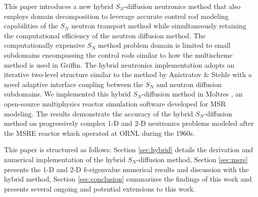 This paper introduces a new hybrid $S_N$-diffusion neutronics method that also employs domain
decomposition to leverage accurate control rod modeling capabilities of the $S_N$ neutron transport
method while simultaneously retaining the computational efficiency of the neutron diffusion method.
The computationally expensive $S_N$ method problem domain is limited to small subdomains
encompassing the control rods similar to how the multischeme method is used in Griffin. The
hybrid neutronics implementation adopts an iterative two-level structure similar to the method by
Anistratov \& Stehle with a novel adaptive interface coupling between the $S_N$ and neutron
diffusion subdomains. We implemented this hybrid $S_N$-diffusion method in Moltres
\cite{lindsay_moltres_2017, park_verification_2022}, an open-source multiphysics reactor simulation
software developed for \gls{MSR} modeling. The results demonstrate the accuracy of the hybrid
$S_N$-diffusion method on progressively complex 1-D and 2-D neutronics problems modeled after
the \gls{MSRE} reactor which operated at \gls{ORNL} during the 1960s.

This paper is structured as follows: Section \ref{sec:hybrid} details the derivation and
numerical implementation of the hybrid $S_N$-diffusion method, Section \ref{sec:msre} presents the
1-D and 2-D $k$-eigenvalue numerical results and discussion with the hybrid method, Section
\ref{sec:conclusion} summarizes the findings of this work and presents several ongoing and
potential extensions to this work.

